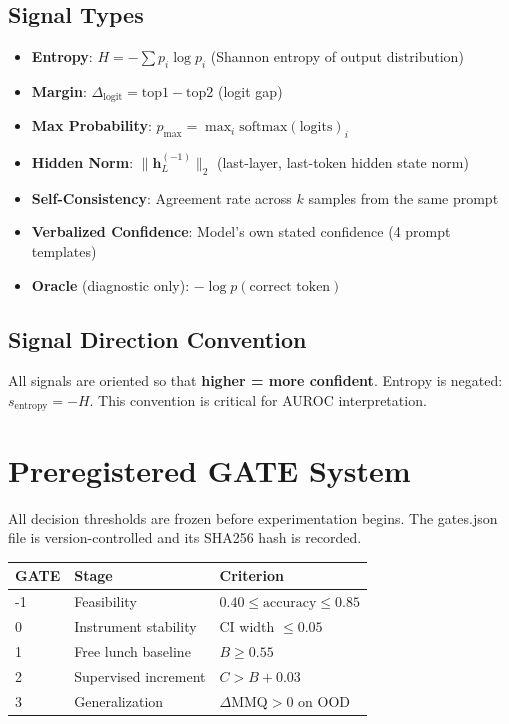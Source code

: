 \documentclass{article}
\begin{document}
\subsection{Signal Types}
\begin{itemize}
\item \textbf{Entropy}: $H = -\sum p_i \log p_i$ (Shannon entropy of output distribution)
\item \textbf{Margin}: $\Delta_{\text{logit}} = \text{top1} - \text{top2}$ (logit gap)
\item \textbf{Max Probability}: $p_{\max} = \max_i \text{softmax}(\text{logits})_i$
\item \textbf{Hidden Norm}: $\|\mathbf{h}_L^{(-1)}\|_2$ (last-layer, last-token hidden state norm)
\item \textbf{Self-Consistency}: Agreement rate across $k$ samples from the same prompt
\item \textbf{Verbalized Confidence}: Model's own stated confidence (4 prompt templates)
\item \textbf{Oracle} (diagnostic only): $-\log p(\text{correct token})$
\end{itemize}

\subsection{Signal Direction Convention}
All signals are oriented so that \textbf{higher = more confident}. Entropy is negated: $s_{\text{entropy}} = -H$. This convention is critical for AUROC interpretation.

\section{Preregistered GATE System}

All decision thresholds are frozen before experimentation begins. The gates.json file is version-controlled and its SHA256 hash is recorded.

\begin{table}[h]
\centering
\begin{tabular}{|l|l|l|}
\hline
\textbf{GATE} & \textbf{Stage} & \textbf{Criterion} \\
\hline
-1 & Feasibility & $0.40 \leq \text{accuracy} \leq 0.85$ \\
0 & Instrument stability & CI width $\leq 0.05$ \\
1 & Free lunch baseline & $B \geq 0.55$ \\
2 & Supervised increment & $C > B + 0.03$ \\
3 & Generalization & $\Delta\text{MMQ} > 0$ on OOD \\
\hline
\end{tabular}
\end{table}
\end{document}
